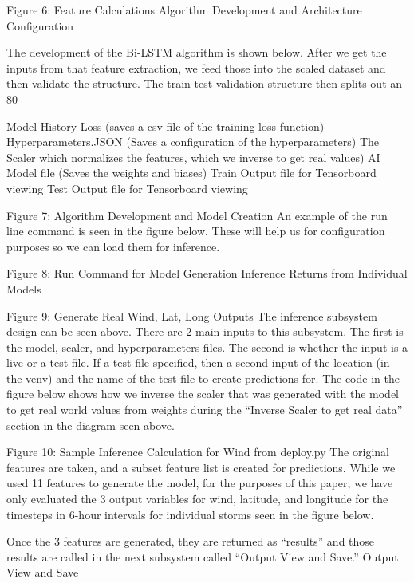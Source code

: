 \documentclass{article}
\begin{document}
Figure 6: Feature Calculations
Algorithm Development and Architecture Configuration

The development of the Bi-LSTM algorithm is shown below. After we get the inputs from that feature extraction, we feed those into the scaled dataset and then validate the structure. The train test validation structure then splits out an 80%

Model History Loss (saves a csv file of the training loss function)
Hyperparameters.JSON (Saves a configuration of the hyperparameters)
The Scaler which normalizes the features, which we inverse to get real values)
AI Model file (Saves the weights and biases)
Train Output file for Tensorboard viewing
Test Output file for Tensorboard viewing


Figure 7: Algorithm Development and Model Creation
An example of the run line command is seen in the figure below. These will help us for configuration purposes so we can load them for inference.


Figure 8: Run Command for Model Generation
Inference Returns from Individual Models

Figure 9: Generate Real Wind, Lat, Long Outputs
The inference subsystem design can be seen above. There are 2 main inputs to this subsystem. The first is the model, scaler, and hyperparameters files. The second is whether the input is a live or a test file. If a test file specified, then a second input of the location (in the venv) and the name of the test file to create predictions for. The code in the figure below shows how we inverse the scaler that was generated with the model to get real world values from weights during the ``Inverse Scaler to get real data'' section in the diagram seen above.


Figure 10: Sample Inference Calculation for Wind from deploy.py
The original features are taken, and a subset feature list is created for predictions. While we used 11 features to generate the model, for the purposes of this paper, we have only evaluated the 3 output variables for wind, latitude, and longitude for the timesteps in 6-hour intervals for individual storms seen in the figure below.


Once the 3 features are generated, they are returned as ``results'' and those results are called in the next subsystem called “Output View and Save.”
Output View and Save 
\end{document}
